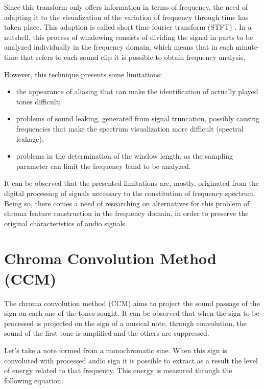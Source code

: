 \documentclass{article}
\begin{document}
	Since this transform only offers information in terms of frequency, the need of adapting it to the visualization of the variation of frequency through time has taken place. This adaption is called short time fourier transform (STFT) \cite{cohen1995time}. In a nutshell, this process of windowing consists of dividing the signal in parts to be analyzed individually in the frequency domain, which means that in each minute-time that refers to each sound clip it is possible to obtain frequency analysis.

	However, this technique presents some limitations:
	\begin{itemize}
		\item the appearance of aliasing that can make the identification of actually played tones difficult;
		\item problems of sound leaking, generated from signal truncation, possibly causing frequencies that make the spectrum visualization more difficult (spectral leakage);
		\item problems in the determination of the window length, as the sampling parameter can limit the frequency band to be analyzed.
	\end{itemize}

	It can be observed that the presented limitations are, mostly, originated from the digital processing of signals necessary to the constitution of frequency spectrum. Being so, there comes  a need of researching on alternatives for this problem of chroma feature construction in the frequency domain, in order to preserve the original characteristics of audio signals.

\section{Chroma Convolution Method (CCM)}\label{sec:ccm}

	The chroma convolution method (CCM) aims to project the sound passage of the sign on each one of the tones sought. It can be observed that when the sign to be processed is projected on the sign of a musical note, through convolution, the sound of the first tone is amplified and the others are suppressed. 

	Let's take a note formed from a monochromatic sine. When this sign is convoluted with processed audio sign it is possible to extract as a result the level of energy related to that frequency.  This energy is measured through the following  equation:
\end{document}
